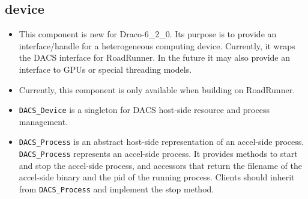 \documentclass[note]{ResearchNote_pdf}
\newcommand{\draco}{Draco}
\newcommand{\dracor}{\draco-6\_2\_0}
\newcommand{\scons}{\textsf{SCons}}
\begin{document}
\subsection{device}
\label{changes:device}
\begin{itemize}
\item This component is new for \dracor.  Its purpose is to provide an
  interface/handle for a heterogeneous computing device.  Currently,
  it wraps the DACS interface for RoadRunner.  In the future it may
  also provide an interface to GPUs or special threading models.
\item Currently, this component is only available when building on
  RoadRunner. 
\item \texttt{DACS\_Device} is a singleton for DACS host-side resource
  and process management. 
\item \texttt{DACS\_Process} is an abstract host-side representation of
  an accel-side process.  \texttt{DACS\_Process} represents an
  accel-side process.  It provides methods to start and stop the
  accel-side process, and accessors that return the filename of the
  accel-side binary and the pid of the running process.  Clients
  should inherit from \texttt{DACS\_Process} and implement the stop
  method.  
\end{itemize}



\end{document}
